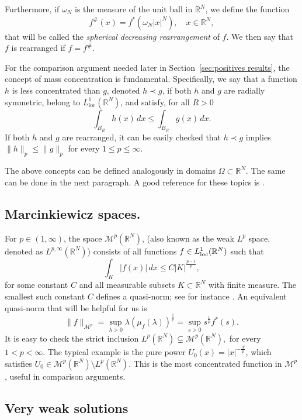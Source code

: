 \documentclass[leqno,12pt]{amsart}
\theoremstyle{definition}
\theoremstyle{remark}
\numberwithin{equation}{section}
\begin{document}
Furthermore, if $\omega_N$ is the measure of the unit ball in $\mathbb{R}^N$, we define the function
\[
 f^\#(x)=f^*(\omega_N |x|^N),\quad x\in \mathbb{R}^N,
\]
that will be called the \emph{spherical decreasing rearrangement} of $f$.
We then say that $f$ is rearranged if $f=f^\#$.

For the comparison argument needed later in Section~\ref{sec:positives results}, the concept of mass concentration is fundamental. Specifically, we say that a function $h$ is less concentrated than $g$, denoted $ h \prec g$, if both $h$ and $g$ are radially symmetric, belong to $L^1_{\mathrm{loc}}(\mathbb{R}^N)$, and satisfy, for all $R>0$
\[
    \int_{B_R}h(x)\,dx\leq \int_{B_R}g(x)\,dx.
\]
If both $h$ and $g$ are rearranged, it can be easily checked that  $h \prec g$ implies $\|h\|_p\le \|g\|_p$ for every $1\le p\le\infty$. 

The above concepts can be defined analogously in domains $\Omega\subset\mathbb{R}^N$. The same can be done in the next paragraph. A good reference for these topics is \cite{vazquez-sym}.
\subsection*{Marcinkiewicz spaces.}
For $p\in(1,\infty)$, the space $\mathcal{M}^p(\mathbb{R}^N)$, (also known as the weak $L^p$ space, denoted as $L^{p,\infty}(\mathbb{R}^N)$) consists of all functions $f\in L^1_{\textup{loc}} (\mathbb{R}^N)$ such that
\[\int_K |f(x)|\,dx\leq C |K|^{\frac{p-1}{p}},\]
for some constant $C$ and all measurable subsets $K\subset \mathbb{R}^N$ with finite measure. The smallest such constant $C$ defines a quasi-norm; see for instance \cite{Grafakos-2014}. An equivalent quasi-norm that will be helpful for us is
\begin{equation}\label{weaknorm}
\|f\|_{\mathcal{M}^p}=\sup_{\lambda>0}\lambda(\mu_f(\lambda))^{\frac1p}=\sup_{s>0}s^{\frac1p}f^*(s).
\end{equation}
It is easy to check the strict inclusion $
L^p(\mathbb{R}^N)\varsubsetneq \mathcal{M}^p(\mathbb{R}^N),
$
for every $1< p<\infty$. The typical example is the pure power $U_0(x)=|x|^{-\frac{N}{p}}$, which satisfies $U_0\in
\mathcal{M}^p(\mathbb{R}^N)\setminus L^p(\mathbb{R}^N)$. This is the most concentrated function in $\mathcal{M}^p$, useful in comparison arguments.


\subsection*{Very weak solutions}
\end{document}
